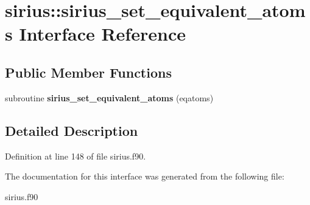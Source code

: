 \hypertarget{interfacesirius_1_1sirius__set__equivalent__atoms}{}\section{sirius\+:\+:sirius\+\_\+set\+\_\+equivalent\+\_\+atoms Interface Reference}
\label{interfacesirius_1_1sirius__set__equivalent__atoms}
\subsection*{Public Member Functions}
\begin{DoxyCompactItemize}
\item 
\hypertarget{interfacesirius_1_1sirius__set__equivalent__atoms_a5184794cf44b8d6664e5de960c0825db}{}subroutine {\bfseries sirius\+\_\+set\+\_\+equivalent\+\_\+atoms} (eqatoms)\label{interfacesirius_1_1sirius__set__equivalent__atoms_a5184794cf44b8d6664e5de960c0825db}

\end{DoxyCompactItemize}


\subsection{Detailed Description}


Definition at line 148 of file sirius.\+f90.



The documentation for this interface was generated from the following file\+:\begin{DoxyCompactItemize}
\item 
sirius.\+f90\end{DoxyCompactItemize}
